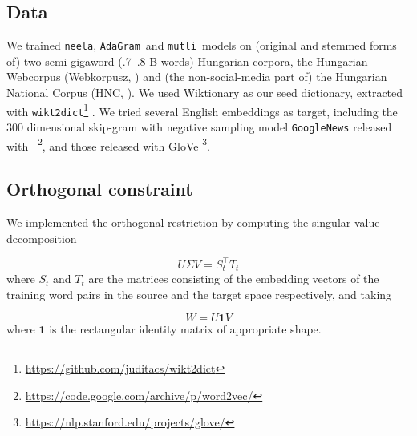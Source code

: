 \documentclass[11pt]{article}
\newcommand{\neelakantan}{\texttt{neela}}
\newcommand{\adagram}{\texttt{AdaGram}}
\newcommand{\mutli}{\texttt{mutli}}
\begin{document}
\subsection{Data}

We trained \neelakantan, \adagram~and \mutli~models on (original and stemmed
forms of) two semi-gigaword (.7--.8 B words) Hungarian corpora, the Hungarian
Webcorpus (Webkorpusz, \cite{Halacsy:2004}) and (the non-social-media part of)
the Hungarian National Corpus (HNC, \cite{Oravecz:2014}).  We used Wiktionary
as our seed dictionary, extracted with
\texttt{wikt2dict}\footnote{\url{https://github.com/juditacs/wikt2dict}}
\citep{Acs:2013}. We tried several English embeddings as target, including the
300 dimensional skip-gram with negative sampling model \texttt{GoogleNews}
released with
\wordtovec~\citep{Mikolov:2013f}\footnote{\url{https://code.google.com/archive/p/word2vec/}},
and those released with GloVe
\citep{Pennington:2014}\footnote{\url{https://nlp.stanford.edu/projects/glove/}}.

\subsection{Orthogonal constraint}

We implemented the orthogonal restriction by computing the singular value
decomposition

\[U\Sigma V=S_t^\top T_t\] where $S_t$ and $T_t$ are the matrices consisting of
the embedding vectors of
the training word pairs in the source and the target space respectively, and
taking

\[W=U\mathbf{1}V\]
where $\mathbf 1$ is the rectangular identity matrix of appropriate shape.
\end{document}
